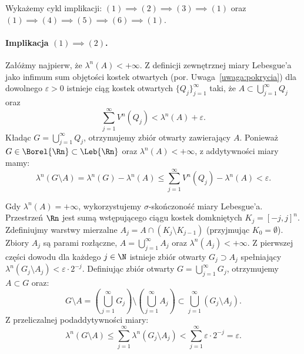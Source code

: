 \begin{dow}
    Wykażemy cykl implikacji: $(1) \implies (2) \implies (3) \implies (1)$ oraz $(1) \implies (4) \implies (5) \implies (6) \implies (1)$.

    \paragraph{Implikacja $(1) \implies (2)$.}
    Załóżmy najpierw, że $\lambda^n(A) < +\infty$. Z definicji zewnętrznej miary Lebesgue'a jako infimum sum objętości kostek otwartych (por. Uwaga~\ref{uwaga:pokrycia}) dla dowolnego $\varepsilon > 0$ istnieje ciąg kostek otwartych $\{Q_j\}_{j=1}^\infty$ taki, że $A \subset \bigcup_{j=1}^\infty Q_j$ oraz
    \begin{equation*}
        \sum_{j=1}^\infty V^n(Q_j) < \lambda^n(A) + \varepsilon.
    \end{equation*}
    Kładąc $G = \bigcup_{j=1}^\infty Q_j$, otrzymujemy zbiór otwarty zawierający $A$. Ponieważ $G \in \Borel{\Rn} \subset \Leb{\Rn}$ oraz $\lambda^n(A) < +\infty$, z addytywności miary mamy:
    \begin{equation*}
        \lambda^n(G \setminus A) = \lambda^n(G) - \lambda^n(A) \le \sum_{j=1}^\infty V^n(Q_j) - \lambda^n(A) < \varepsilon.
    \end{equation*}

    Gdy $\lambda^n(A) = +\infty$, wykorzystujemy $\sigma$-skończoność miary Lebesgue'a. Przestrzeń $\Rn$ jest sumą wstępującego ciągu kostek domkniętych $K_j = [-j, j]^n$. Zdefiniujmy warstwy mierzalne $A_j = A \cap (K_j \setminus K_{j-1})$ (przyjmując $K_0 = \emptyset$). Zbiory $A_j$ są parami rozłączne, $A = \bigcup_{j=1}^\infty A_j$ oraz $\lambda^n(A_j) < +\infty$.
    Z pierwszej części dowodu dla każdego $j \in \N$ istnieje zbiór otwarty $G_j \supset A_j$ spełniający $\lambda^n(G_j \setminus A_j) < \varepsilon \cdot 2^{-j}$.
    Definiując zbiór otwarty $G = \bigcup_{j=1}^\infty G_j$, otrzymujemy $A \subset G$ oraz:
    \begin{equation*}
        G \setminus A = \left(\bigcup_{j=1}^\infty G_j\right) \setminus \left(\bigcup_{j=1}^\infty A_j\right) \subset \bigcup_{j=1}^\infty (G_j \setminus A_j).
    \end{equation*}
    Z przeliczalnej podaddytywności miary:
    \begin{equation*}
        \lambda^n(G \setminus A) \le \sum_{j=1}^\infty \lambda^n(G_j \setminus A_j) < \sum_{j=1}^\infty \varepsilon \cdot 2^{-j} = \varepsilon.
    \end{equation*}


\end{dow}
